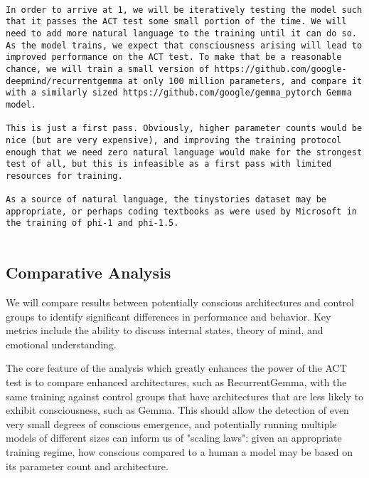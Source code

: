 \documentclass{article}
\begin{document}
\begin{lstlisting}[breaklines=true, breakatwhitespace=true, columns=flexible, basicstyle=\ttfamily\small]

In order to arrive at 1, we will be iteratively testing the model such that it passes the ACT test some small portion of the time. We will need to add more natural language to the training until it can do so. As the model trains, we expect that consciousness arising will lead to improved performance on the ACT test. To make that be a reasonable chance, we will train a small version of https://github.com/google-deepmind/recurrentgemma at only 100 million parameters, and compare it with a similarly sized https://github.com/google/gemma_pytorch Gemma model.

This is just a first pass. Obviously, higher parameter counts would be nice (but are very expensive), and improving the training protocol enough that we need zero natural language would make for the strongest test of all, but this is infeasible as a first pass with limited resources for training.

As a source of natural language, the tinystories dataset may be appropriate, or perhaps coding textbooks as were used by Microsoft in the training of phi-1 and phi-1.5.


\end{lstlisting}
\subsection{Comparative Analysis}
We will compare results between potentially conscious architectures and control groups to identify significant differences in performance and behavior. Key metrics include the ability to discuss internal states, theory of mind, and emotional understanding.

The core feature of the analysis which greatly enhances the power of the ACT test is to compare enhanced architectures, such as RecurrentGemma, with the same training against control groups that have architectures that are less likely to exhibit consciousness, such as Gemma. This should allow the detection of even very small degrees of conscious emergence, and potentially running multiple models of different sizes can inform us of "scaling laws": given an appropriate training regime, how conscious compared to a human a model may be based on its parameter count and architecture.
\end{document}
